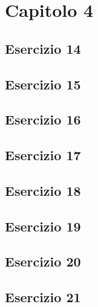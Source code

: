 \section{\textbf{Capitolo 4}}
\subsection{Esercizio 14}

\subsection{Esercizio 15}

\subsection{Esercizio 16}

\subsection{Esercizio 17}

\subsection{Esercizio 18}

\subsection{Esercizio 19}

\subsection{Esercizio 20}

\subsection{Esercizio 21}

